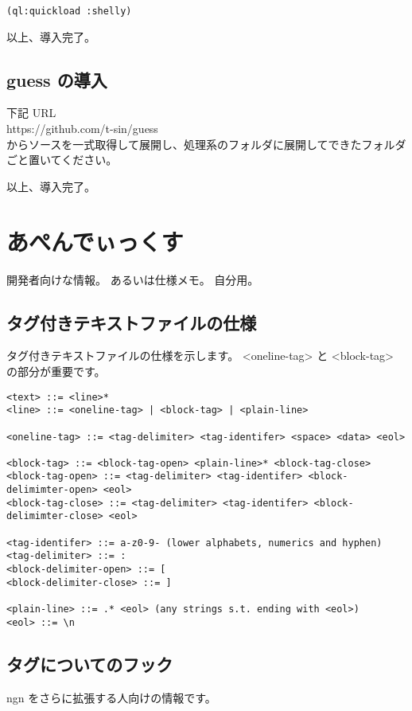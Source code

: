 \documentclass[a4j]{jsarticle}
\begin{document}
\begin{lstlisting}
(ql:quickload :shelly)
\end{lstlisting}

以上、導入完了。


\subsection{guess の導入}
下記 URL \\
https://github.com/t-sin/guess \\
からソースを一式取得して展開し、処理系のフォルダに展開してできたフォルダごと置いてください。

以上、導入完了。


\section{あぺんでぃっくす}
開発者向けな情報。
あるいは仕様メモ。
自分用。


\subsection{タグ付きテキストファイルの仕様}

タグ付きテキストファイルの仕様を示します。
<oneline-tag> と <block-tag> の部分が重要です。

\begin{lstlisting}[caption=タグ付きテキストファイル]
<text> ::= <line>*
<line> ::= <oneline-tag> | <block-tag> | <plain-line>

<oneline-tag> ::= <tag-delimiter> <tag-identifer> <space> <data> <eol>

<block-tag> ::= <block-tag-open> <plain-line>* <block-tag-close>
<block-tag-open> ::= <tag-delimiter> <tag-identifer> <block-delimimter-open> <eol>
<block-tag-close> ::= <tag-delimiter> <tag-identifer> <block-delimimter-close> <eol>
  
<tag-identifer> ::= a-z0-9- (lower alphabets, numerics and hyphen)  
<tag-delimiter> ::= :
<block-delimiter-open> ::= [
<block-delimiter-close> ::= ]

<plain-line> ::= .* <eol> (any strings s.t. ending with <eol>)  
<eol> ::= \n
\end{lstlisting}


\subsection{タグについてのフック}
ngn をさらに拡張する人向けの情報です。
\end{document}
